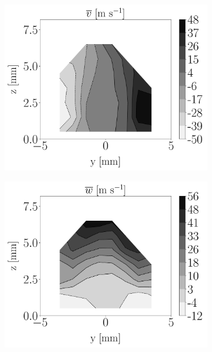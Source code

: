 \begin{figure}[ht]
\begin{subfigure}[b]{0.2\textwidth}
\end{subfigure}
\hspace*{0.45in}
\begin{subfigure}[b]{0.2\textwidth}
	\flushleft
   \includegraphics[scale=0.19]{./part2_developments/figures_ch6_lagrangian_JICF/injectors_SLI/uG100_dx10_x05_uy_mean_map}
\end{subfigure}
\hspace*{0.45in}
\begin{subfigure}[b]{0.2\textwidth}
	\flushleft
   \includegraphics[scale=0.19]{./part2_developments/figures_ch6_lagrangian_JICF/injectors_SLI/uG100_dx10_x05_uz_mean_map}
\end{subfigure}


\end{figure}
